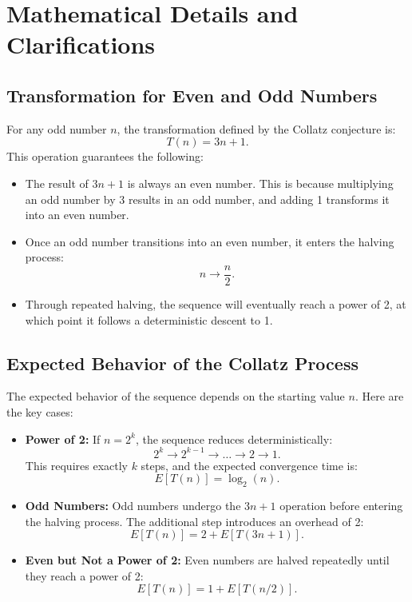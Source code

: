 \appendix
\section{Mathematical Details and Clarifications}

\subsection{Transformation for Even and Odd Numbers}
For any odd number \( n \), the transformation defined by the Collatz conjecture is:
\[
T(n) = 3n + 1.
\]
This operation guarantees the following:
\begin{itemize}
    \item The result of \( 3n + 1 \) is always an even number. This is because multiplying an odd number by 3 results in an odd number, and adding 1 transforms it into an even number.
    \item Once an odd number transitions into an even number, it enters the halving process:
    \[
    n \to \frac{n}{2}.
    \]
    \item Through repeated halving, the sequence will eventually reach a power of 2, at which point it follows a deterministic descent to 1.
\end{itemize}

\subsection{Expected Behavior of the Collatz Process}
The expected behavior of the sequence depends on the starting value \( n \). Here are the key cases:
\begin{itemize}
    \item \textbf{Power of 2:} If \( n = 2^k \), the sequence reduces deterministically:
    \[
    2^k \to 2^{k-1} \to \dots \to 2 \to 1.
    \]
    This requires exactly \( k \) steps, and the expected convergence time is:
    \[
    E[T(n)] = \log_2(n).
    \]

    \item \textbf{Odd Numbers:} Odd numbers undergo the \( 3n + 1 \) operation before entering the halving process. The additional step introduces an overhead of 2:
    \[
    E[T(n)] = 2 + E[T(3n + 1)].
    \]

    \item \textbf{Even but Not a Power of 2:} Even numbers are halved repeatedly until they reach a power of 2:
    \[
    E[T(n)] = 1 + E[T(n/2)].
    \]
\end{itemize}

